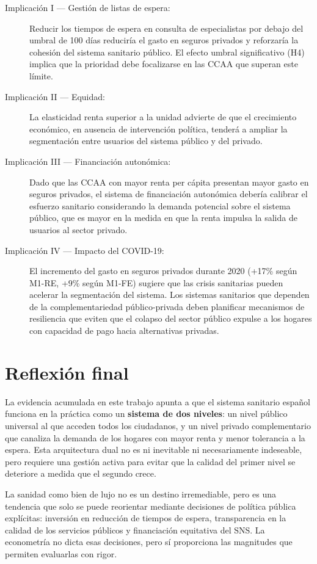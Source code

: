 \begin{description}
  \item[Implicación I --- Gestión de listas de espera:] Reducir los tiempos de
    espera en consulta de especialistas por debajo del umbral de 100 días
    reduciría el gasto en seguros privados y reforzaría la cohesión del sistema
    sanitario público. El efecto umbral significativo (H4) implica que la
    prioridad debe focalizarse en las CCAA que superan este límite.

  \item[Implicación II --- Equidad:] La elasticidad renta superior a la unidad
    advierte de que el crecimiento económico, en ausencia de intervención política,
    tenderá a ampliar la segmentación entre usuarios del sistema público y del
    privado.

  \item[Implicación III --- Financiación autonómica:] Dado que las CCAA con mayor
    renta per cápita presentan mayor gasto en seguros privados, el sistema de
    financiación autonómica debería calibrar el esfuerzo sanitario considerando
    la demanda potencial sobre el sistema público, que es mayor en la medida en
    que la renta impulsa la salida de usuarios al sector privado.

  \item[Implicación IV --- Impacto del COVID-19:] El incremento del gasto en
    seguros privados durante 2020 (+17\% según M1-RE, +9\% según M1-FE) sugiere
    que las crisis sanitarias pueden acelerar la segmentación del sistema. Los
    sistemas sanitarios que dependen de la complementariedad público-privada
    deben planificar mecanismos de resiliencia que eviten que el colapso del
    sector público expulse a los hogares con capacidad de pago hacia
    alternativas privadas.
\end{description}

\section{Reflexión final}

La evidencia acumulada en este trabajo apunta a que el sistema sanitario español
funciona en la práctica como un \textbf{sistema de dos niveles}: un nivel público
universal al que acceden todos los ciudadanos, y un nivel privado complementario
que canaliza la demanda de los hogares con mayor renta y menor tolerancia a la
espera. Esta arquitectura dual no es ni inevitable ni necesariamente indeseable,
pero requiere una gestión activa para evitar que la calidad del primer nivel
se deteriore a medida que el segundo crece.

La sanidad como bien de lujo no es un destino irremediable, pero es una tendencia
que solo se puede reorientar mediante decisiones de política pública explícitas:
inversión en reducción de tiempos de espera, transparencia en la calidad de los
servicios públicos y financiación equitativa del SNS. La econometría no dicta esas
decisiones, pero sí proporciona las magnitudes que permiten evaluarlas con rigor.
